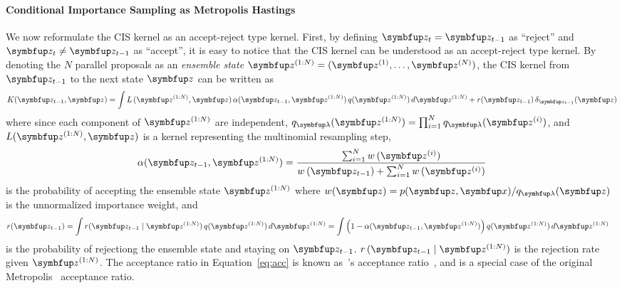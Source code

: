 \paragraph{Conditional Importance Sampling as Metropolis Hastings}
We now reformulate the CIS kernel as an accept-reject type kernel.
First, by defining \(\vz_t = \vz_{t-1}\) as ``reject'' and \(\vz_t \neq \vz_{t-1}\) as ``accept'', it is easy to notice that the CIS kernel can be understood as an accept-reject type kernel.
By denoting the \(N\) parallel proposals as an \textit{ensemble state} \(\vz^{(1:N)} = (\vz^{(1)}, \ldots, \vz^{(N)})\), the CIS kernel from \(\vz_{t-1}\) to the next state \(\vz\) can be written as
\begin{align}
  K(\vz_{t-1}, \vz) = \int L\,(\vz^{(1:N)}, \vz) \, \alpha(\vz_{t-1}, \vz^{(1:N)}) \, q(\vz^{(1:N)}) \, d\vz^{(1:N)}
  + r(\vz_{t-1})\,\delta_{\vz_{t-1}}(\vz)
\end{align}
where since each component of \(\vz^{(1:N)}\) are independent, \(q_{\vlambda}(\vz^{(1:N)}) = \prod^N_{i=1} q_{\vlambda}(\vz^{(i)}) \), and \(L(\vz^{(1:N)}, \vz)\) is a kernel representing the multinomial resampling step,
\begin{align}
  \alpha(\vz_{t-1}, \vz^{(1:N)})
  = \frac{\sum^{N}_{i=1} w\,(\vz^{(i)})}{w\,(\vz_{t-1}) + \sum^{N}_{i=1} w\,(\vz^{(i)})} \label{eq:acc}
\end{align}
is the probability of accepting the ensemble state \(\vz^{(1:N)}\) where \(w(\vz) = p(\vz,\vx)/ q_{\vlambda}(\vz)\) is the unnormalized importance weight, and
\begin{align}
  r(\vz_{t-1}) &= \int r(\vz_{t-1} \mid \vz^{(1:N)})\,q(\vz^{(1:N)}) \, d\vz^{(1:N)}
  = \int \left(1 - \alpha(\vz_{t-1}, \vz^{(1:N)})\right) q(\vz^{(1:N)}) \, d\vz^{(1:N)}
\end{align}
is the probability of rejectiong the ensemble state and staying on \(\vz_{t-1}\).
\(r\,(\vz_{t-1}\mid \vz^{(1:N)})\) is the rejection rate given \(\vz^{(1:N)}\).
The acceptance ratio in Equation~\eqref{eq:acc} is known as~\citeauthor{barker_monte_1965}'s acceptance ratio~\citep{barker_monte_1965}, and is a special case of the original Metropolis~\cite{metropolis_equation_1953} acceptance ratio.


